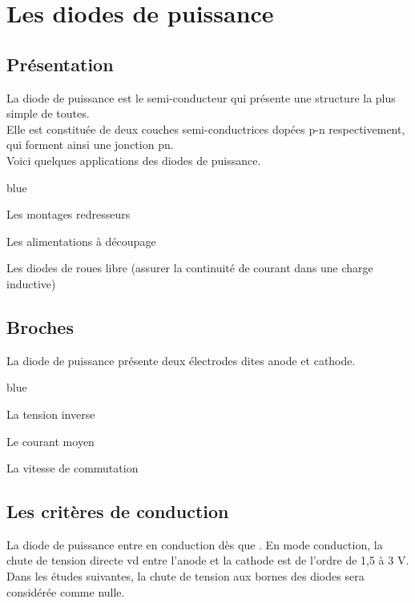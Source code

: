 {\section{Les diodes de puissance}

\subsection{Présentation}

La diode de puissance est le semi-conducteur qui présente une structure la plus simple
de toutes. \\
Elle est constituée de deux couches semi-conductrices dopées p-n
respectivement, qui forment ainsi une jonction pn. \\
Voici quelques applications des diodes de puissance.

\begin{items}{blue}{\Triangle}
    \item Les montages redresseurs
    \item Les alimentations à découpage
    \item Les diodes de roues libre (assurer la continuité de courant dans une charge inductive)
\end{items}

\subsection{Broches}

La diode de puissance présente deux électrodes dites anode et cathode. 

\begin{items}{blue}{\Triangle}
  \item La tension inverse
  \item Le courant moyen
  \item La vitesse de commutation
\end{items}


\subsection{Les critères de conduction}

La diode de puissance entre en conduction dès que . En mode conduction, la chute de tension directe vd entre l’anode
et la cathode est de l’ordre de 1,5 à 3 V. \\
Dans les études suivantes, la chute de tension aux bornes des diodes sera considérée comme nulle.


}
